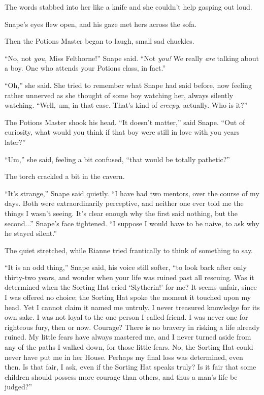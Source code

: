 The words stabbed into her like a knife and she couldn’t help gasping out loud.

Snape’s eyes flew open, and his gaze met hers across the sofa.

Then the Potions Master began to laugh, small sad chuckles.

“No, not \emph{you,} Miss Felthorne!” Snape said. “Not \emph{you!} We really \emph{are} talking about a boy. One who attends your Potions class, in fact.”

“Oh,” she said. She tried to remember what Snape had said before, now feeling rather unnerved as she thought of some boy watching her, always silently watching. “Well, um, in that case. That’s kind of \emph{creepy}, actually. Who is it?”

The Potions Master shook his head. “It doesn’t matter,” said Snape. “Out of curiosity, what would you think if that boy were still in love with you years later?”

“Um,” she said, feeling a bit confused, “that would be totally pathetic?”

The torch crackled a bit in the cavern.

“It’s strange,” Snape said quietly. “I have had two mentors, over the course of my days. Both were extraordinarily perceptive, and neither one ever told me the things I wasn’t seeing. It’s clear enough why the first said nothing, but the second...” Snape’s face tightened. “I suppose I would have to be naive, to ask why he stayed silent.”

The quiet stretched, while Rianne tried frantically to think of something to say.

“It is an odd thing,” Snape said, his voice still softer, “to look back after only thirty-two years, and wonder when your life was ruined past all rescuing. Was it determined when the Sorting Hat cried ‘Slytherin!’ for me? It seems unfair, since I was offered no choice; the Sorting Hat spoke the moment it touched upon my head. Yet I cannot claim it named me untruly. I never treasured knowledge for its own sake. I was not loyal to the one person I called friend. I was never one for righteous fury, then or now. Courage? There is no bravery in risking a life already ruined. My little fears have always mastered me, and I never turned aside from any of the paths I walked down, for those little fears. No, the Sorting Hat could never have put me in her House. Perhaps my final loss was determined, even then. Is that fair, I ask, even if the Sorting Hat speaks truly? Is it fair that some children should possess more courage than others, and thus a man’s life be judged?”


